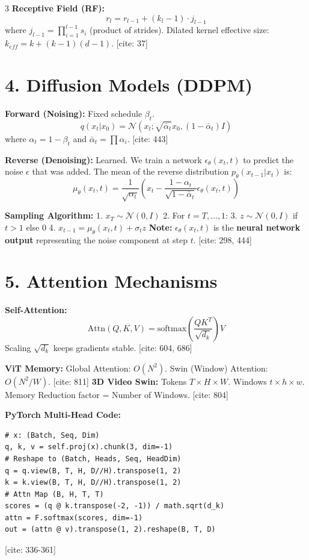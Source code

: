 \documentclass[10pt,landscape]{article}
\newcommand{\N}{\mathcal{N}}
\begin{document}
\begin{multicols*}{3}
\textbf{Receptive Field (RF):}
$$ r_l = r_{l-1} + (k_l - 1) \cdot j_{l-1} $$
where $j_{l-1} = \prod_{i=1}^{l-1} s_i$ (product of strides).
Dilated kernel effective size: $k_{eff} = k + (k-1)(d-1)$. [cite: 37]

\section*{4. Diffusion Models (DDPM)}
\textbf{Forward (Noising):} Fixed schedule $\beta_t$.
$$ q(x_t|x_0) = \N(x_t; \sqrt{\bar{\alpha}_t}x_0, (1-\bar{\alpha}_t)I) $$
where $\alpha_t = 1-\beta_t$ and $\bar{\alpha}_t = \prod \alpha_i$. [cite: 443]

\textbf{Reverse (Denoising):} Learned.
We train a network $\epsilon_\theta(x_t, t)$ to predict the noise $\epsilon$ that was added.
The mean of the reverse distribution $p_\theta(x_{t-1}|x_t)$ is:
$$ \mu_\theta(x_t, t) = \frac{1}{\sqrt{\alpha_t}} \left( x_t - \frac{1-\alpha_t}{\sqrt{1-\bar{\alpha}_t}} \epsilon_\theta(x_t, t) \right) $$

\textbf{Sampling Algorithm:}
1. $x_T \sim \N(0, I)$
2. For $t = T, \dots, 1$:
3. $z \sim \N(0, I)$ if $t > 1$ else $0$
4. $x_{t-1} = \mu_\theta(x_t, t) + \sigma_t z$
\textbf{Note:} $\epsilon_\theta(x_t, t)$ is the \textbf{neural network output} representing the noise component at step $t$. [cite: 298, 444]

\section*{5. Attention Mechanisms}

\textbf{Self-Attention:}
$$ \text{Attn}(Q,K,V) = \text{softmax}\left(\frac{QK^T}{\sqrt{d_k}}\right)V $$
Scaling $\sqrt{d_k}$ keeps gradients stable. [cite: 604, 686]

\textbf{ViT Memory:}
Global Attention: $O(N^2)$.
Swin (Window) Attention: $O(N^2/W)$. [cite: 811]
\textbf{3D Video Swin:}
Tokens $T \times H \times W$. Windows $t \times h \times w$.
Memory Reduction factor = Number of Windows. [cite: 804]

\textbf{PyTorch Multi-Head Code:}
\begin{lstlisting}
# x: (Batch, Seq, Dim)
q, k, v = self.proj(x).chunk(3, dim=-1)
# Reshape to (Batch, Heads, Seq, HeadDim)
q = q.view(B, T, H, D//H).transpose(1, 2)
k = k.view(B, T, H, D//H).transpose(1, 2)
# Attn Map (B, H, T, T)
scores = (q @ k.transpose(-2, -1)) / math.sqrt(d_k)
attn = F.softmax(scores, dim=-1)
out = (attn @ v).transpose(1, 2).reshape(B, T, D)
\end{lstlisting}
[cite: 336-361]


\end{multicols*}
\end{document}
